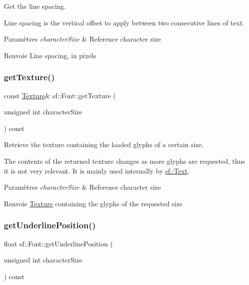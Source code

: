 Get the line spacing. 

Line spacing is the vertical offset to apply between two consecutive lines of text.


\begin{DoxyParams}{Paramètres}
{\em character\+Size} & Reference character size\\
\hline
\end{DoxyParams}
\begin{DoxyReturn}{Renvoie}
Line spacing, in pixels 
\end{DoxyReturn}
\mbox{\label{classsf_1_1Font_a15528d289f91cfd4b2597f8a9423e612}} 
\subsubsection{\texorpdfstring{get\+Texture()}{getTexture()}}
{\footnotesize\ttfamily const \hyperlink{classsf_1_1Texture}{Texture}\& sf\+::\+Font\+::get\+Texture (\begin{DoxyParamCaption}\item[{unsigned int}]{character\+Size }\end{DoxyParamCaption}) const}



Retrieve the texture containing the loaded glyphs of a certain size. 

The contents of the returned texture changes as more glyphs are requested, thus it is not very relevant. It is mainly used internally by \hyperlink{classsf_1_1Text}{sf\+::\+Text}.


\begin{DoxyParams}{Paramètres}
{\em character\+Size} & Reference character size\\
\hline
\end{DoxyParams}
\begin{DoxyReturn}{Renvoie}
\hyperlink{classsf_1_1Texture}{Texture} containing the glyphs of the requested size 
\end{DoxyReturn}
\mbox{\label{classsf_1_1Font_a726a55f40c19ac108e348b103190caad}} 
\subsubsection{\texorpdfstring{get\+Underline\+Position()}{getUnderlinePosition()}}
{\footnotesize\ttfamily float sf\+::\+Font\+::get\+Underline\+Position (\begin{DoxyParamCaption}\item[{unsigned int}]{character\+Size }\end{DoxyParamCaption}) const}



